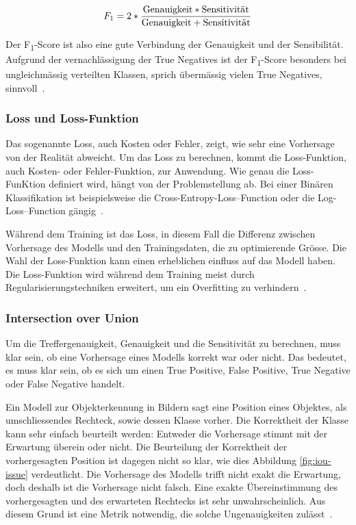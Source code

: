 $$F_1=2 * \frac{\textnormal{Genauigkeit} * \textnormal{Sensitivität}}{\textnormal{Genauigkeit} + \textnormal{Sensitivität}}$$

Der F\textsubscript{1}-Score ist also eine gute Verbindung der Genauigkeit und der Sensibilität. Aufgrund der vernachlässigung der True Negatives ist der F\textsubscript{1}-Score besonders bei ungleichmässig verteilten Klassen, sprich übermässig vielen True Negatives, sinnvoll~\autocite{TDSAccuracy}.

\subsubsection{Loss und Loss-Funktion}

Das sogenannte Loss, auch Kosten oder Fehler, zeigt, wie sehr eine Vorhersage von der Realität abweicht. Um das Loss zu berechnen, kommt die Loss-Funktion, auch Kosten- oder Fehler-Funktion, zur Anwendung. Wie genau die Loss-FunKtion definiert wird, hängt von der Problemstellung ab. Bei einer Binären Klassifikation ist beispielsweise die Cross-Entropy-Loss–Function oder die Log-Loss–Function gängig~\autocite{TDSLoss}. 

Während dem Training ist das Loss, in diesem Fall die Differenz zwischen Vorhersage des Modells und den Trainingsdaten, die zu optimierende Grösse. Die Wahl der Loss-Funktion kann einen erheblichen einfluss auf das Modell haben. Die Loss-Funktion wird während dem Training meist durch Regularisierungstechniken erweitert, um ein Overfitting zu verhindern~\autocite{Goodfellow2016}.

\subsubsection{Intersection over Union}

Um die Treffergenauigkeit, Genauigkeit und die Sensitivität zu berechnen, muss klar sein, ob eine Vorhersage eines Modells korrekt war oder nicht. Das bedeutet, es muss klar sein, ob es sich um einen True Positive, False Positive, True Negative oder False Negative handelt. 

Ein Modell zur Objekterkennung in Bildern sagt eine Position eines Objektes, als umschliessendes Rechteck, sowie dessen Klasse vorher. Die Korrektheit der Klasse kann sehr einfach beurteilt werden: Entweder die Vorhersage stimmt mit der Erwartung überein oder nicht. Die Beurteilung der Korrektheit der vorhergesagten Position ist dagegen nicht so klar, wie dies Abbildung \ref{fig:iou-issue} verdeutlicht. Die Vorhersage des Modells trifft nicht exakt die Erwartung, doch deshalb ist die Vorhersage nicht falsch. Eine exakte Übereinstimmung des vorhergesagten und des erwarteten Rechtecks ist sehr unwahrscheinlich. Aus diesem Grund ist eine Metrik notwendig, die solche Ungenauigkeiten zulässt~\autocite{IoU}.

